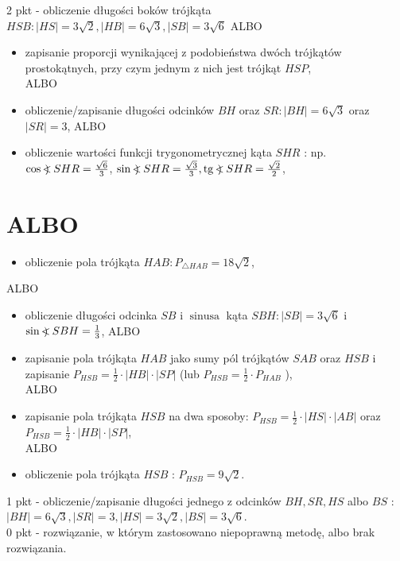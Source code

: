 \documentclass[10pt]{article}
\newcommand\Varangle{\mathop{{<\!\!\!\!\!\text{\small)}}\:}\nolimits}
\begin{document}
2 pkt - obliczenie długości boków trójkąta $H S B:|H S|=3 \sqrt{2},|H B|=6 \sqrt{3},|S B|=3 \sqrt{6}$ ALBO

\begin{itemize}
  \item zapisanie proporcji wynikającej z podobieństwa dwóch trójkątów prostokątnych, przy czym jednym z nich jest trójkąt $H S P$,\\
ALBO
  \item obliczenie/zapisanie długości odcinków $B H$ oraz $S R:|B H|=6 \sqrt{3}$ oraz $|S R|=3$, ALBO
  \item obliczenie wartości funkcji trygonometrycznej kąta $S H R$ : np. $\cos \Varangle S H R=\frac{\sqrt{6}}{3}$, $\sin \Varangle S H R=\frac{\sqrt{3}}{3}, \operatorname{tg} \Varangle S H R=\frac{\sqrt{2}}{2}$,
\end{itemize}

\section*{ALBO}
\begin{itemize}
  \item obliczenie pola trójkąta $H A B: P_{\triangle H A B}=18 \sqrt{2}$,
\end{itemize}

ALBO

\begin{itemize}
  \item obliczenie długości odcinka $S B$ i $\operatorname{sinusa}$ kąta $S B H:|S B|=3 \sqrt{6}$ i $\sin \Varangle S B H=\frac{1}{3}$, ALBO
  \item zapisanie pola trójkąta $H A B$ jako sumy pól trójkątów $S A B$ oraz $H S B$ i zapisanie $P_{H S B}=\frac{1}{2} \cdot|H B| \cdot|S P|$ (lub $P_{H S B}=\frac{1}{2} \cdot P_{H A B}$ ),\\
ALBO
  \item zapisanie pola trójkąta $H S B$ na dwa sposoby: $P_{H S B}=\frac{1}{2} \cdot|H S| \cdot|A B|$ oraz\\
$P_{H S B}=\frac{1}{2} \cdot|H B| \cdot|S P|$,\\
ALBO
  \item obliczenie pola trójkąta $H S B$ : $P_{H S B}=9 \sqrt{2}$.
\end{itemize}

1 pkt - obliczenie/zapisanie długości jednego z odcinków $B H, S R, H S$ albo $B S$ :\\
$|B H|=6 \sqrt{3},|S R|=3,|H S|=3 \sqrt{2},|B S|=3 \sqrt{6}$.\\
0 pkt - rozwiązanie, w którym zastosowano niepoprawną metodę, albo brak rozwiązania.
\end{document}
